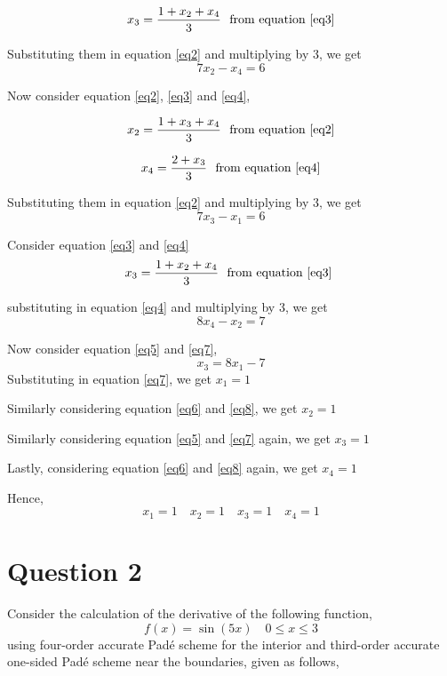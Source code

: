 \documentclass[12pt]{article}
\begin{document}
$$x_3 = \frac{1+x_2+x_4}{3} \text{\ \ from equation \eqref{eq3}}$$

\noindent Substituting them in equation \eqref{eq2} and multiplying by 3, we get
\begin{equation}
    7x_2 - x_4 = 6
    \label{eq6}
\end{equation}

\noindent Now consider equation \eqref{eq2}, \eqref{eq3} and \eqref{eq4},

$$x_2 = \frac{1+x_3+x_4}{3} \text{\ \ from equation \eqref{eq2}}$$

$$x_4 = \frac{2+x_3}{3} \text{\ \ from equation \eqref{eq4}}$$

\noindent Substituting them in equation \eqref{eq2} and multiplying by 3, we get
\begin{equation}
    7x_3 - x_1 = 6
    \label{eq7}
\end{equation}

\noindent Consider equation \eqref{eq3} and \eqref{eq4}
$$x_3 = \frac{1+x_2+x_4}{3} \text{\ \ from equation \eqref{eq3} }$$

substituting in equation \eqref{eq4} and multiplying by 3, we get 
\begin{equation}
    8x_4-x_2 = 7
    \label{eq8}
\end{equation}

\noindent Now consider equation \eqref{eq5} and \eqref{eq7},
$$x_3 = 8x_1 - 7$$
\noindent Substituting in equation \eqref{eq7}, we get $x_1 = 1$

\noindent Similarly considering equation \eqref{eq6} and \eqref{eq8}, we get $x_2 = 1$

\noindent Similarly considering equation \eqref{eq5} and \eqref{eq7} again, we get $x_3 = 1$

\noindent Lastly, considering equation \eqref{eq6} and \eqref{eq8} again, we get $x_4 = 1$

\noindent Hence, 
$$
\boxed{x_1 =1} \quad \boxed{x_2 = 1} \quad \boxed{x_3 = 1} \quad \boxed{x_4 = 1}
$$

\section*{Question 2}

Consider the calculation of the derivative of the following function,
$$
f(x) = \sin(5x) \quad 0\leq x \leq 3
$$
using four-order accurate Padé scheme for the interior and third-order accurate one-sided Padé scheme near the boundaries, given as follows,
\end{document}
